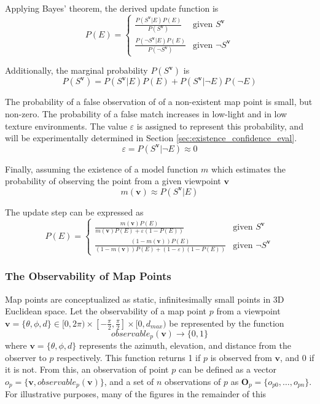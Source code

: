 Applying Bayes' theorem, the derived update function is
\[
    P(E) = \begin{cases}
        \frac{P(S^{\boldsymbol{v}}|E)P(E)}{P(S^{\boldsymbol{v}})}           & \text{given }S^{\boldsymbol{v}}      \\
        \frac{P(\neg S^{\boldsymbol{v}}|E)P(E)}{P(\neg S^{\boldsymbol{v}})} & \text{given }\neg S^{\boldsymbol{v}}
    \end{cases}
\]

Additionally, the marginal probability $P(S^{\boldsymbol{v}})$ is
$$
    P(S^{\boldsymbol{v}}) = P(S^{\boldsymbol{v}}|E)P(E) + P(S^{\boldsymbol{v}}|\neg E)P(\neg E)
$$

The probability of a false observation of of a non-existent map point is small, but non-zero. The probability of a false match increases in low-light and in low texture environments. The value $\varepsilon$ is assigned to represent this probability, and will be experimentally determined in Section \ref{sec:existence_confidence_eval}.
$$
    \varepsilon = P(S^{\boldsymbol{v}}|\neg E) \approx 0
$$

Finally, assuming the existence of a model function $m$ which estimates the probability of observing the point from a given viewpoint $\boldsymbol{v}$
$$
    m(\boldsymbol{v}) \approx P(S^{\boldsymbol{v}}|E)
$$

The update step can be expressed as
\[
    P(E) = \begin{cases}
        \frac{m(\boldsymbol{v})P(E)}{m(\boldsymbol{v})P(E) + \varepsilon(1-P(E))}             & \text{given }S^{\boldsymbol{v}}      \\
        \frac{(1-m(\boldsymbol{v}))P(E)}{(1-m(\boldsymbol{v}))P(E) + (1-\varepsilon)(1-P(E))} & \text{given }\neg S^{\boldsymbol{v}}
    \end{cases}
\]

\subsubsection{The Observability of Map Points}

Map points are conceptualized as static, infinitesimally small points in 3D Euclidean space. Let the observability of a map point $p$ from a viewpoint $\boldsymbol{v} = \{\theta,\phi,d\}\in[0,2\pi)\times\left[-\frac{\pi}{2},\frac{\pi}{2}\right]\times[0,d_{max})$ be represented by the function
$$
    observable_p(\boldsymbol{v})\to\{0,1\}
$$
where $\boldsymbol{v} = \{\theta,\phi,d\}$ represents the azimuth, elevation, and distance from the observer to $p$ respectively. This function returns 1 if $p$ is observed from $\boldsymbol{v}$, and 0 if it is not. From this, an observation of point $p$ can be defined as a vector $o_p=\{\boldsymbol{v},observable_p(\boldsymbol{v})\}$, and a set of $n$ observations of $p$ as $\boldsymbol{O}_p=\{o_{p0},\dots,o_{pn}\}$. For illustrative purposes, many of the figures in the remainder of this 

